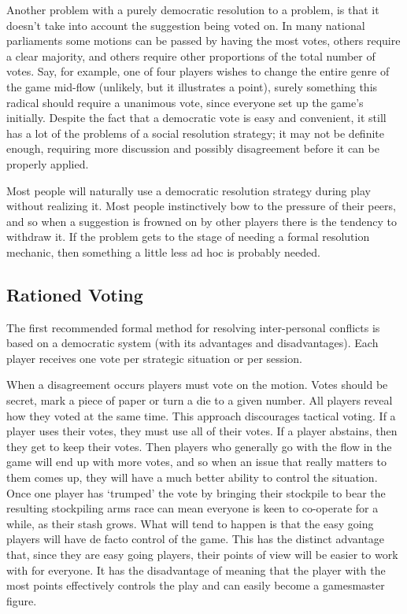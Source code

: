 \documentclass[twoside]{book}
\begin{document}
Another problem with a purely democratic resolution to a problem, is
that it doesn't take into account the suggestion being voted on. In
many national parliaments some motions can be passed by having the
most votes, others require a clear majority, and others require other
proportions of the total number of votes. Say, for example, one of
four players wishes to change the entire genre of the game mid-flow
(unlikely, but it illustrates a point), surely something this radical
should require a unanimous vote, since everyone set up the game's
initially. Despite the fact that a democratic vote is easy and
convenient, it still has a lot of the problems of a social resolution
strategy; it may not be definite enough, requiring more discussion and
possibly disagreement before it can be properly applied.

Most people will naturally use a democratic resolution strategy during
play without realizing it. Most people instinctively bow to the
pressure of their peers, and so when a suggestion is frowned on by
other players there is the tendency to withdraw it. If the problem
gets to the stage of needing a formal resolution mechanic, then
something a little less ad hoc is probably needed.

\subsection{Rationed Voting}

The first recommended formal method for resolving inter-personal
conflicts is based on a democratic system (with its advantages and
disadvantages). Each player receives one vote per strategic situation
or per session.

When a disagreement occurs players must vote on the motion. Votes
should be secret, mark a piece of paper or turn a die to a given
number. All players reveal how they voted at the same time. This
approach discourages tactical voting. If a player uses their votes,
they must use all of their votes. If a player abstains, then they get
to keep their votes. Then players who generally go with the flow in
the game will end up with more votes, and so when an issue that really
matters to them comes up, they will have a much better ability to
control the situation. Once one player has `trumped' the vote by
bringing their stockpile to bear the resulting stockpiling arms race
can mean everyone is keen to co-operate for a while, as their stash
grows. What will tend to happen is that the easy going players will
have de facto control of the game. This has the distinct advantage
that, since they are easy going players, their points of view will be
easier to work with for everyone. It has the disadvantage of meaning
that the player with the most points effectively controls the play and
can easily become a gamesmaster figure.
\end{document}
